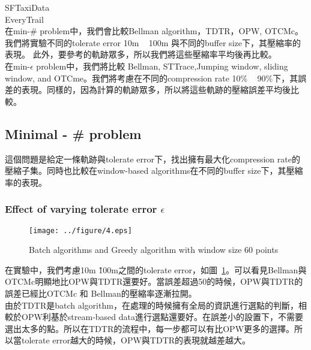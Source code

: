 \documentclass[12pt]{article}
\begin{document}
\begin{CJK}{UTF8}{bsmi}
SFTaxiData\\

EveryTrail\\




在min-\# problem中，我們會比較Bellman algorithm，TDTR，OPW, OTCMc。我們將實驗不同的tolerate error 10m ~ 100m 與不同的buffer size下，其壓縮率的表現。 此外，要參考的軌跡眾多，所以我們將這些壓縮率平均後再比較。\\

在min-$\epsilon$ problem中，我們將比較 Bellman, STTrace,Jumping window, sliding window, and OTCme。我們將考慮在不同的compression rate 10\% ~ 90\%下，其誤差的表現。同樣的，因為計算的軌跡眾多，所以將這些軌跡的壓縮誤差平均後比較。\\









\subsection{Minimal - \# problem}
這個問題是給定一條軌跡與tolerate error下，找出擁有最大化compression rate的壓縮子集。同時也比較在window-based algorithms在不同的buffer size下，其壓縮率的表現。



\subsubsection{Effect of varying tolerate error $\epsilon$}


\begin{figure}[ht]
\begin{center}
\texttt{[image: ../figure/4.eps]}
\caption{Batch algorithms and Greedy algorithm with window size 60 points}
\label{fig:fig4}
\end{center}
\end{figure}


在實驗中，我們考慮10m \~ 100m之間的tolerate error，如圖~\ref{fig:fig4}。可以看見Bellman與OTCMc明顯地比OPW與TDTR還要好。當誤差超過50的時候，OPW與TDTR的誤差已經比OTCMc 和 Bellman的壓縮率逐漸拉開。\\

由於TDTR是batch algorithm，在處理的時候擁有全局的資訊進行選點的判斷，相較於OPW利基於stream-based data進行選點還要好。在誤差小的設置下，不需要選出太多的點。所以在TDTR的流程中，每一步都可以有比OPW更多的選擇。所以當tolerate error越大的時候，OPW與TDTR的表現就越差越大。\\


\end{CJK}
\end{document}
